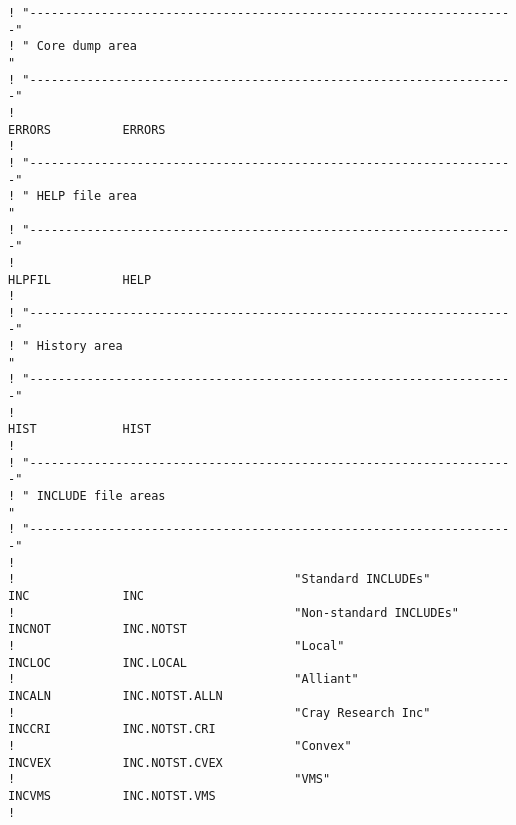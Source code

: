 \begin{verbatim}
! "--------------------------------------------------------------------"
! " Core dump area                                                     "
! "--------------------------------------------------------------------"
!
ERRORS          ERRORS
!
! "--------------------------------------------------------------------"
! " HELP file area                                                     "
! "--------------------------------------------------------------------"
!
HLPFIL          HELP
!
! "--------------------------------------------------------------------"
! " History area                                                       "
! "--------------------------------------------------------------------"
!
HIST            HIST
!
! "--------------------------------------------------------------------"
! " INCLUDE file areas                                                 "
! "--------------------------------------------------------------------"
!
!                                       "Standard INCLUDEs"
INC             INC
!                                       "Non-standard INCLUDEs"
INCNOT          INC.NOTST
!                                       "Local"
INCLOC          INC.LOCAL
!                                       "Alliant"
INCALN          INC.NOTST.ALLN
!                                       "Cray Research Inc"
INCCRI          INC.NOTST.CRI
!                                       "Convex"
INCVEX          INC.NOTST.CVEX
!                                       "VMS"
INCVMS          INC.NOTST.VMS
!
\end{verbatim}
